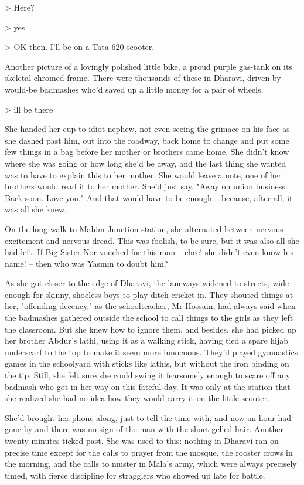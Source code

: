 \textgreater{} Here?

\textgreater{} yes

\textgreater{} OK then. I'll be on a Tata 620 scooter.

Another picture of a lovingly polished little bike, a proud purple
gas-tank on its skeletal chromed frame. There were thousands of
these in Dharavi, driven by would-be badmashes who'd saved up a
little money for a pair of wheels.

\textgreater{} ill be there

She handed her cup to idiot nephew, not even seeing the grimace on
his face as she dashed past him, out into the roadway, back home to
change and put some few things in a bag before her mother or
brothers came home. She didn't know where she was going or how long
she'd be away, and the last thing she wanted was to have to explain
this to her mother. She would leave a note, one of her brothers
would read it to her mother. She'd just say, "Away on union
business. Back soon. Love you." And that would have to be enough --
because, after all, it was all she knew.

On the long walk to Mahim Junction station, she alternated between
nervous excitement and nervous dread. This was foolish, to be sure,
but it was also all she had left. If Big Sister Nor vouched for
this man -- chee! she didn't even know his name! -- then who was
Yasmin to doubt him?

As she got closer to the edge of Dharavi, the laneways widened to
streets, wide enough for skinny, shoeless boys to play
ditch-cricket in. They shouted things at her, "offending decency,"
as the schoolteacher, Mr Hossain, had always said when the
badmashes gathered outside the school to call things to the girls
as they left the classroom. But she knew how to ignore them, and
besides, she had picked up her brother Abdur's lathi, using it as a
walking stick, having tied a spare hijab underscarf to the top to
make it seem more innocuous. They'd played gymnastics games in the
schoolyard with sticks like lathis, but without the iron binding on
the tip. Still, she felt sure she could swing it fearsomely enough
to scare off any badmash who got in her way on this fateful day. It
was only at the station that she realized she had no idea how they
would carry it on the little scooter.

She'd brought her phone along, just to tell the time with, and now
an hour had gone by and there was no sign of the man with the short
gelled hair. Another twenty minutes ticked past. She was used to
this: nothing in Dharavi ran on precise time except for the calls
to prayer from the mosque, the rooster crows in the morning, and
the calls to muster in Mala's army, which were always precisely
timed, with fierce discipline for stragglers who showed up late for
battle.

